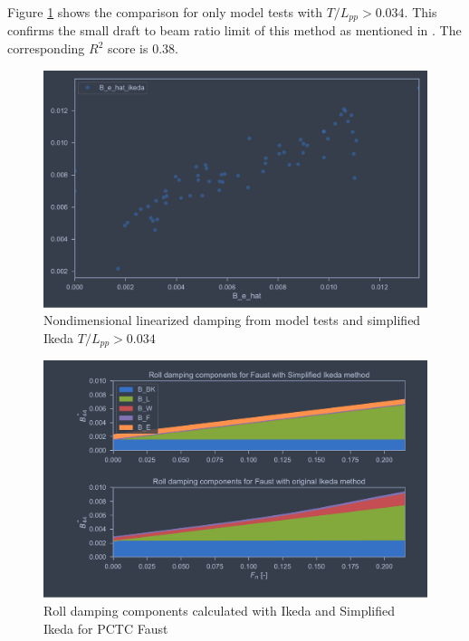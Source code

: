 Figure \ref{fig:B_e_hat_good} shows the comparison for only model tests with $T/L_{pp}>0.034$.
This confirms the small draft to beam ratio limit of this method as mentioned in \cite{kawahara_simple_2011}. The corresponding $R^2$ score is 0.38.

\begin{figure}[H]
    \centering
    \includegraphics[width=\columnwidth]{figures/B_e_hat_good.pdf}
    \caption{Nondimensional linearized damping from model tests and simplified Ikeda $T/L_{pp}>0.034$}
    \label{fig:B_e_hat_good}
\end{figure}






\begin{figure}[h]
    \centering
    \includegraphics[width=\columnwidth]{figures/ikeda_vs_simplified.pdf}
    \caption{Roll damping components calculated with Ikeda and Simplified Ikeda for PCTC Faust}
    \label{fig:ikeda_vs_simplified}
\end{figure}

